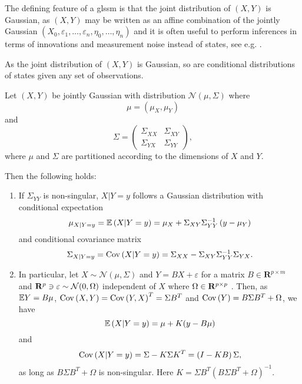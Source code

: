 The defining feature of a \gls{glssm} is that the joint distribution of $(X,Y)$ is Gaussian, as $(X,Y)$ may be written as an affine combination of the jointly Gaussian $(X_{0}, \varepsilon_{1}, \dots, \varepsilon_{n}, \eta_{0}, \dots, \eta_{n})$ and it is often useful to perform inferences in terms of innovations and measurement noise instead of states, see e.g. \citep[Section 4.5]{Durbin2012Time}.

As the joint distribution of $(X, Y)$ is Gaussian, so are conditional distributions of states given any set of observations.

\begin{lemma}
    \label{lem:gaussian_conditional}
    Let $(X,Y)$ be jointly Gaussian with distribution $\mathcal N \left( \mu, \Sigma \right)$ where 
    $$
    \mu = \left(\mu_{X}, \mu_{Y}\right)
    $$
    and 
    $$
    \Sigma = \begin{pmatrix}
        \Sigma_{XX} & \Sigma_{XY} \\
        \Sigma_{YX} & \Sigma_{YY}
    \end{pmatrix},
    $$
    where $\mu$ and $\Sigma$ are partitioned according to the dimensions of $X$ and $Y$. 
    
    Then the following holds:
    
    \begin{enumerate}
        \item \label{it:cond_gaussian} If $\Sigma_{YY}$ is non-singular, $X|Y = y$ follows a Gaussian distribution with conditional expectation
            $$
            \mu_{X|Y = y} = \mathbb E \left( X | Y = y \right) = \mu_{X} + \Sigma_{XY}\Sigma_{YY}^{-1} \left( y - \mu_{Y} \right)
            $$
            and conditional covariance matrix 
            $$
            \Sigma_{X| Y =y} = \operatorname{Cov} \left( X | Y = y \right) = \Sigma_{XX} - \Sigma_{XY} \Sigma_{YY}^{-1} \Sigma_{YX}.
            $$

        \item In particular, let $X\sim \mathcal N(\mu, \Sigma)$ and $Y = BX + \varepsilon$ for a matrix $B \in \mathbf R^{p\times m}$ and $\mathbf R^{p} \ni \varepsilon \sim \mathcal N(0, \Omega)$ independent of $X$ where $\Omega \in \mathbf R^{p\times p}$ . 
            Then, as 
            $\mathbb E Y = B \mu$, $\operatorname{Cov} \left( X,Y \right) = \operatorname{Cov} \left( Y, X \right)^{T}= \Sigma B^{T}$ and $\operatorname{Cov} \left( Y \right) = B \Sigma B^{T} + \Omega$, we have
            $$
                \mathbb E \left( X | Y = y \right) = \mu + K (y - B \mu)
            $$
            and 
            $$
            \operatorname{Cov} \left( X | Y = y \right) = \Sigma - K \Sigma K^{T} = \left( I  -  KB \right) \Sigma,
            $$
            as long as $B \Sigma B^{T} + \Omega$ is non-singular.
            Here $K = \Sigma B^{T} \left( B \Sigma B^{T} + \Omega \right)^{-1}$.


\end{enumerate}
\end{lemma}
